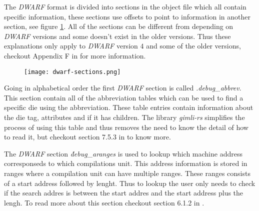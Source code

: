  


The \emph{DWARF} format is divided into sections in the object file which all contain specific information, these sections use offsets to point to information in another section, see figure \ref{fig:dwarfsections}.
All of the sections can be different from depending on \emph{DWARF} versions and some doesn't exist in the older versions.
Thus these explanations only apply to \emph{DWARF} version $4$ and some of the older versions, checkout Appendix F in \cite{dwarf} for more information.

\begin{figure}[h]
    \centering
    \texttt{[image: dwarf-sections.png]}
    \label{fig:dwarfsections}
\end{figure}


Going in alphabetical order the first \emph{DWARF} section is called \emph{.debug\_abbrev}.
This section contain all of the abbreviation tables which can be used to find a specific die using the abbreviation.
These table entries contain information about the die tag, attributes and if it has children.
The library \emph{gimli-rs} simplifies the process of using this table and thus removes the need to know the detail of how to read it, but checkout section 7.5.3 in \cite{dwarf} to know more.


The \emph{DWARF} section \emph{\.debug\_aranges} is used to lookup which machine address corresponseds to which compilations unit.
This address information is stored in ranges where a compilation unit can have multiple ranges.
These ranges consists of a start address followed by lenght.
Thus to lookup the user only needs to check if the search addres is between the start addres and the start address plus the lengh.
To read more about this section checkout section 6.1.2 in \cite{dwarf}.



